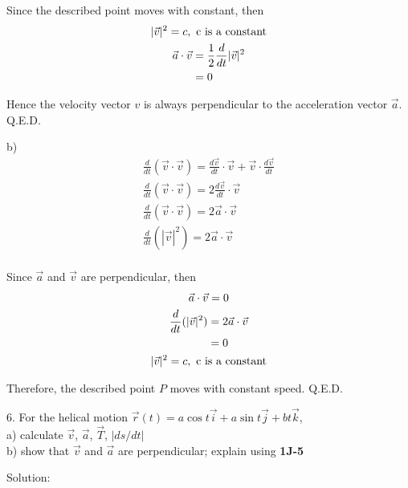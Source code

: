 \documentclass{article}
\begin{document}
Since the described point moves with constant, then
\begin{gather*}
  |\vec{v}|^2 = c ,\ \textnormal{c is a constant} \\
  \begin{split}
    \vec{a} \cdot \vec{v} &= \frac{1}{2} \frac{d}{dt} |\vec{v}|^2 \\
                          &= 0 \\
  \end{split}
\end{gather*}

Hence the velocity vector $v$ is always perpendicular to the acceleration vector 
$\vec{a}$. Q.E.D.

b)
\begin{gather*}
  \frac{d}{dt} (\vec{v} \cdot \vec{v}) = \frac{d\vec{v}}{dt} \cdot \vec{v} + \vec{v} \cdot \frac{d\vec{v}}{dt} \\
  \frac{d}{dt} (\vec{v} \cdot \vec{v}) = 2 \frac{d\vec{v}}{dt} \cdot \vec{v} \\
  \frac{d}{dt} (\vec{v} \cdot \vec{v}) = 2 \vec{a} \cdot \vec{v} \\
  \frac{d}{dt} (|\vec{v}|^2) = 2 \vec{a} \cdot \vec{v} \\
\end{gather*}

Since $\vec{a}$ and $\vec{v}$ are perpendicular, then
\begin{gather*}
  \vec{a} \cdot \vec{v} = 0 \\
  \begin{split}
    \frac{d}{dt} (|\vec{v}|^2) &= 2 \vec{a} \cdot \vec{v} \\
                               &= 0 \\
  \end{split} \\
  |\vec{v}|^2 = c ,\ \textnormal{c is a constant}
\end{gather*}

Therefore, the described point $P$ moves with constant speed. Q.E.D.

\bigskip

6. For the helical motion 
$\vec{r}(t) = a \cos t \vec{i} + a \sin t \vec{j} + bt \vec{k}$, \\
a) calculate $\vec{v}$, $\vec{a}$, $\vec{T}$, $|ds/dt|$ \\
b) show that $\vec{v}$ and $\vec{a}$ are perpendicular; explain using 
\textbf{1J-5}

Solution:
\end{document}
